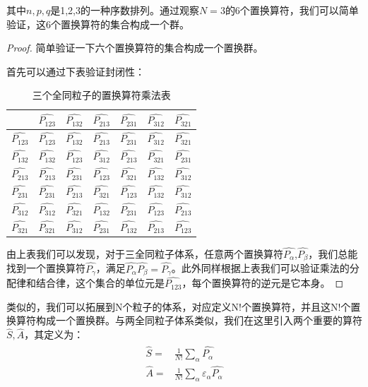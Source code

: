     其中$n,p,q$是1,2,3的一种序数排列。通过观察$N=3$的6个置换算符，我们可以简单验证，这6个置换算符的集合构成一个群。
    \begin{proof}
        简单验证一下六个置换算符的集合构成一个置换群。
        
        首先可以通过下表验证封闭性：
        \begin{table}[h]
            \centering
           \begin{tabular}{ |c||c|c|c|c|c|c|  }
         \hline
         \quad&$\hat{P_{123}}$& $\hat{P_{132}}$&$\hat{P_{213}}$&$\hat{P_{231}}$&$\hat{P_{312}}$&$ \hat{P_{321}}$\\
         \hline\hline
          $\hat{P_{123}}$&$\hat{P_{123}}$&$ \hat{P_{132}}$&$\hat{P_{213}}$&$\hat{P_{231}}$&$\hat{P_{312}}$&$ \hat{P_{321}}$\\
         \hline
         $\hat{P_{132}}$&$\hat{P_{132}}$&$\hat{P_{123}}$&$\hat{P_{312}}$&$\hat{P_{213}}$&$\hat{P_{321}}$&$\hat{P_{231}}$\\
         \hline
         $\hat{P_{213}}$&$\hat{P_{213}}$&$\hat{P_{231}}$&$\hat{P_{123}}$&$\hat{P_{321}}$&$\hat{P_{132}}$&$\hat{P_{312}}$\\
         \hline
         $\hat{P_{231}}$&$\hat{P_{231}}$&$\hat{P_{213}}$&$\hat{P_{321}}$&$\hat{P_{123}}$&$\hat{P_{132}}$&$\hat{P_{312}}$\\
         \hline
         $\hat{P_{312}}$&$\hat{P_{312}}$&$\hat{P_{321}}$&$\hat{P_{132}}$&$\hat{P_{231}}$&$\hat{P_{123}}$&$\hat{P_{213}}$\\
         \hline
         $\hat{P_{321}}$&$\hat{P_{321}}$&$\hat{P_{312}}$&$\hat{P_{231}}$&$\hat{P_{132}}$&$\hat{P_{213}}$&$\hat{P_{123}}$\\
         \hline
        \end{tabular}
            \caption{三个全同粒子的置换算符乘法表}
            \label{permutationgroup}
        \end{table}
        
        由上表我们可以发现，对于三全同粒子体系，任意两个置换算符$\hat{P_\alpha}$,$\hat{P_{\beta}}$，我们总能找到一个置换算符$\hat{P_\gamma}$，满足$\hat{P_\alpha}\hat{P_{\beta}}=\hat{P_{\gamma}}$。此外同样根据上表我们可以验证乘法的分配律和结合律，这个集合的单位元是$\hat{P_{123}}$，每个置换算符的逆元是它本身。
    \end{proof}
    
    类似的，我们可以拓展到N个粒子的体系，对应定义N!个置换算符，并且这N!个置换算符构成一个置换群。与两全同粒子体系类似，我们在这里引入两个重要的算符$\hat{S},\hat{A}$，其定义为：
    \begin{align}
        \begin{split}
            \hat{S}=&\frac{1}{N!}\sum_\alpha \hat{P_\alpha}\\
            \hat{A}=&\frac{1}{N!}\sum_\alpha \varepsilon_\alpha\hat{P_\alpha}
        \end{split}
    \end{align}
    

